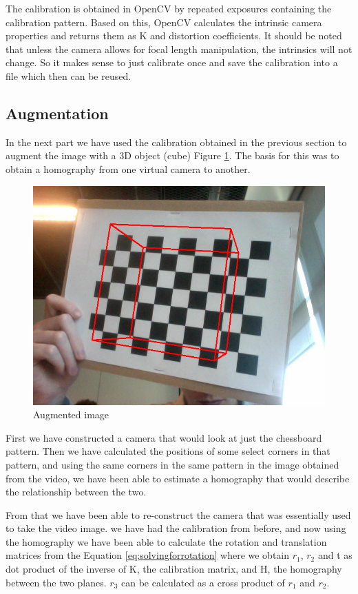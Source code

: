 The calibration is obtained in OpenCV by repeated exposures containing the calibration pattern. Based on this, OpenCV calculates the intrinsic camera properties and returns them as K and distortion coefficients. It should be noted that unless the camera allows for focal length manipulation, the intrinsics will not change. So it makes sense to just calibrate once and save the calibration into a file which then can be reused.

\subsection{Augmentation}

In the next part we have used the calibration obtained in the previous section to augment the image with a 3D object (cube) Figure \ref{fig:augment}. The basis for this was to obtain a homography from one virtual camera to another. 

\begin{figure}[h!]
	\centering
	\includegraphics[width=\textwidth]{Handin2/images/augmentation1.png}
	\caption{Augmented image}
	\label{fig:augment}
\end{figure}

First we have constructed a camera that would look at just the chessboard pattern. Then we have calculated the positions of some select corners in that pattern, and using the same corners in the same pattern in the image obtained from the video, we have been able to estimate a homography that would describe the relationship between the two.

From that we have been able to re-construct the camera that was essentially used to take the video image. we have had the calibration from before, and now using the homography we have been able to calculate the rotation and translation matrices from the Equation \ref{eq:solvingforrotation} where we obtain $r_{1}$, $r_{2}$ and t as dot product of the inverse of K, the calibration matrix, and H, the homography between the two planes. $r_{3}$ can be calculated as a cross product of $r_{1}$ and $r_{2}$.

